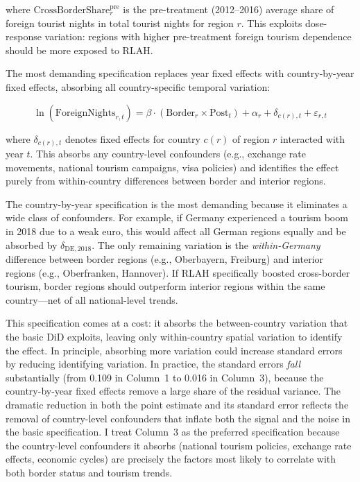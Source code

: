 \documentclass[12pt]{article}
\begin{document}
\noindent where $\text{CrossBorderShare}_{r}^{\text{pre}}$ is the pre-treatment (2012--2016) average share of foreign tourist nights in total tourist nights for region $r$. This exploits dose-response variation: regions with higher pre-treatment foreign tourism dependence should be more exposed to RLAH.

The most demanding specification replaces year fixed effects with country-by-year fixed effects, absorbing all country-specific temporal variation:

\begin{equation}
\ln(\text{ForeignNights}_{r,t}) = \beta \cdot (\text{Border}_r \times \text{Post}_t) + \alpha_r + \delta_{c(r),t} + \varepsilon_{r,t}
\label{eq:cxy}
\end{equation}

\noindent where $\delta_{c(r),t}$ denotes fixed effects for country $c(r)$ of region $r$ interacted with year $t$. This absorbs any country-level confounders (e.g., exchange rate movements, national tourism campaigns, visa policies) and identifies the effect purely from within-country differences between border and interior regions.

The country-by-year specification is the most demanding because it eliminates a wide class of confounders. For example, if Germany experienced a tourism boom in 2018 due to a weak euro, this would affect all German regions equally and be absorbed by $\delta_{\text{DE},2018}$. The only remaining variation is the \textit{within-Germany} difference between border regions (e.g., Oberbayern, Freiburg) and interior regions (e.g., Oberfranken, Hannover). If RLAH specifically boosted cross-border tourism, border regions should outperform interior regions within the same country---net of all national-level trends.

This specification comes at a cost: it absorbs the between-country variation that the basic DiD exploits, leaving only within-country spatial variation to identify the effect. In principle, absorbing more variation could increase standard errors by reducing identifying variation. In practice, the standard errors \textit{fall} substantially (from 0.109 in Column~1 to 0.016 in Column~3), because the country-by-year fixed effects remove a large share of the residual variance. The dramatic reduction in both the point estimate and its standard error reflects the removal of country-level confounders that inflate both the signal and the noise in the basic specification. I treat Column~3 as the preferred specification because the country-level confounders it absorbs (national tourism policies, exchange rate effects, economic cycles) are precisely the factors most likely to correlate with both border status and tourism trends.
\end{document}
